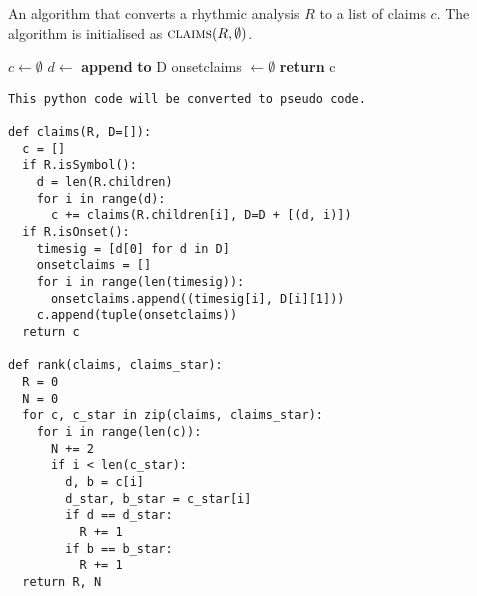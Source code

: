 \begin{algorithm}
\caption{An algorithm that converts a rhythmic analysis $R$ to a list of claims $c$. The algorithm is initialised as $\textsc{claims}(R, \emptyset)$.}
\label{alg:claims}
\begin{algorithmic}
	\State $c \leftarrow \emptyset$
		\State$d \leftarrow $ 
			\State \textbf{append}  \textbf{to} D
		\EndFor
		\State onsetclaims $\leftarrow \emptyset$
		\EndFor
	\EndIf
	\State \textbf{return} c
\EndFunction
\end{algorithmic}
\end{algorithm}
\begin{verbatim}
This python code will be converted to pseudo code.

def claims(R, D=[]):
  c = []
  if R.isSymbol():
    d = len(R.children)
    for i in range(d):
      c += claims(R.children[i], D=D + [(d, i)])
  if R.isOnset():
    timesig = [d[0] for d in D]
    onsetclaims = []
    for i in range(len(timesig)):
      onsetclaims.append((timesig[i], D[i][1]))
    c.append(tuple(onsetclaims))
  return c

def rank(claims, claims_star):
  R = 0
  N = 0
  for c, c_star in zip(claims, claims_star):
    for i in range(len(c)):
      N += 2
      if i < len(c_star):
        d, b = c[i]
        d_star, b_star = c_star[i]
        if d == d_star:
          R += 1
        if b == b_star:
          R += 1
  return R, N
\end{verbatim}







